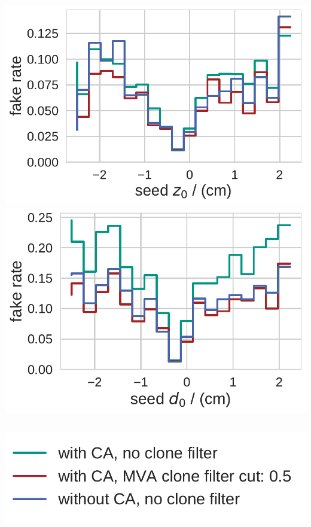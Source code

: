 \documentclass[18pt, aspectratio=169]{beamer}
\begin{document}
\begin{frame}
\begin{columns}
    \begin{column}{.5\textwidth}
      \centering
      \includegraphics[width=.55\textwidth]{figures/fake_rate_by_z0_truth_fullreco.pdf}\\
      \includegraphics[width=.55\textwidth]{figures/fake_rate_by_d0_truth_fullreco.pdf}      
    \end{column}
  \end{columns}
  \begin{center}
    \includegraphics[width=.25\textwidth]{figures/legend_fom_profile.pdf}\\
  \end{center}  
\end{frame}
\end{document}
